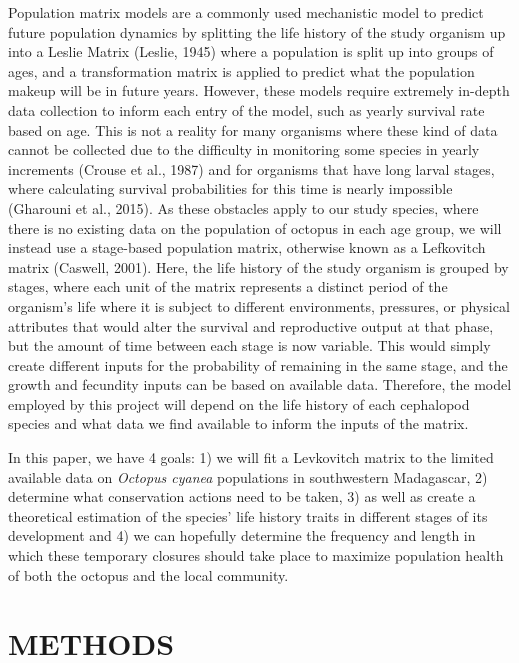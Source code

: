 \documentclass[
]{article}
\begin{document}
Population matrix models are a commonly used mechanistic model to predict future population dynamics by splitting the life history of the study organism up into a Leslie Matrix (Leslie, 1945) where a population is split up into groups of ages, and a transformation matrix is applied to predict what the population makeup will be in future years. However, these models require extremely in-depth data collection to inform each entry of the model, such as yearly survival rate based on age. This is not a reality for many organisms where these kind of data cannot be collected due to the difficulty in monitoring some species in yearly increments (Crouse et al., 1987) and for organisms that have long larval stages, where calculating survival probabilities for this time is nearly impossible (Gharouni et al., 2015). As these obstacles apply to our study species, where there is no existing data on the population of octopus in each age group, we will instead use a stage-based population matrix, otherwise known as a Lefkovitch matrix (Caswell, 2001). Here, the life history of the study organism is grouped by stages, where each unit of the matrix represents a distinct period of the organism's life where it is subject to different environments, pressures, or physical attributes that would alter the survival and reproductive output at that phase, but the amount of time between each stage is now variable. This would simply create different inputs for the probability of remaining in the same stage, and the growth and fecundity inputs can be based on available data. Therefore, the model employed by this project will depend on the life history of each cephalopod species and what data we find available to inform the inputs of the matrix.

In this paper, we have 4 goals: 1) we will fit a Levkovitch matrix to the limited available data on \emph{Octopus cyanea} populations in southwestern Madagascar, 2) determine what conservation actions need to be taken, 3) as well as create a theoretical estimation of the species' life history traits in different stages of its development and 4) we can hopefully determine the frequency and length in which these temporary closures should take place to maximize population health of both the octopus and the local community.

\hypertarget{methods}{%
\section{METHODS}\label{methods}}
\end{document}
